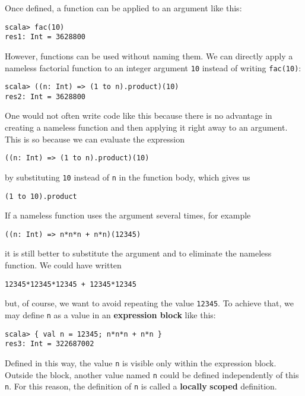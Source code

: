 Once defined, a function can be applied to an argument like this:
\begin{lstlisting}
scala> fac(10)
res1: Int = 3628800
\end{lstlisting}
However, functions can be used without naming them. We can directly
apply a nameless factorial function to an integer argument \lstinline!10!
instead of writing \lstinline!fac(10)!:
\begin{lstlisting}
scala> ((n: Int) => (1 to n).product)(10)
res2: Int = 3628800
\end{lstlisting}
One would not often write code like this because there is no advantage
in creating a nameless function and then applying it right away to
an argument. This is so because we can evaluate the expression
\begin{lstlisting}
((n: Int) => (1 to n).product)(10)
\end{lstlisting}
by substituting \lstinline!10!
instead of \lstinline!n!
in the function body, which gives us
\begin{lstlisting}
(1 to 10).product
\end{lstlisting}
If a nameless function uses the argument several times, for example
\begin{lstlisting}
((n: Int) => n*n*n + n*n)(12345)
\end{lstlisting}
it is still better to substitute the argument and to eliminate the
nameless function. We could have written
\begin{lstlisting}
12345*12345*12345 + 12345*12345
\end{lstlisting}
but, of course, we want to avoid repeating the value \lstinline!12345!.
To achieve that, we may define \texttt{}\lstinline!n!
as a value in an \textbf{expression block}
like this: 
\begin{lstlisting}
scala> { val n = 12345; n*n*n + n*n }
res3: Int = 322687002
\end{lstlisting}
Defined in this way, the value \lstinline!n!
is visible only within the expression block. Outside the block, another
value named \lstinline!n!
could be defined independently of this \lstinline!n!.
For this reason, the definition of \lstinline!n!
is called a \textbf{locally} \textbf{scoped} definition.

